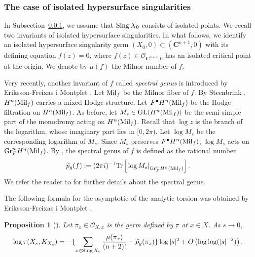 \documentclass[amscd, leqno]{amsart}
\theoremstyle{plain}
\newtheorem{proposition}[theorem]{Proposition}
\theoremstyle{definition}
\theoremstyle{remark}
\begin{document}
\subsubsection
{The case of isolated hypersurface singularities}
\label{sect:5.2.2}
\par
In Subsection~\ref{sect:5.2.2}, we assume that ${\rm Sing}\,X_{0}$ consists of isolated points. 
We recall two invariants of isolated hypersurface singularities.
In what follows, we identify an isolated hypersurface singularity germ $(X_{0},0) \subset ({\mathbf C}^{n+1},0)$ 
with its defining equation $f(z)=0$, where $f(z) \in {\mathcal O}_{{\mathbf C}^{n+1},0}$ has an isolated critical point at the origin. 
We denote by $\mu(f)$ the Milnor number of $f$.
\par
Very recently, another invariant of $f$ called {\em spectral genus} is introduced by Eriksson-Freixas i Montplet \cite{ErikssonFreixas26}. 
Let ${\rm Mil}_{f}$ be the Milnor fiber of $f$. By Steenbrink \cite[Sect.\,3]{Steenbrink77}, 
$H^{n}({\rm Mil}_{f})$ carries a mixed Hodge structure. Let $F^{\bullet}H^{n}({\rm Mil}_{f})$ be the Hodge filtration on $H^{n}({\rm Mil}_{f})$. 
As before, let $M_{s} \in {\rm GL}( H^{n}({\rm Mil}_{f}) )$ be the semi-simple part of the monodromy acting on $H^{n}({\rm Mil}_{f})$. 
Recall that $\log z$ is the branch of the logarithm, whose imaginary part lies in $[0, 2\pi)$. 
Let $\log M_{s}$ be the corresponding logarithm of $M_{s}$. Since $M_{s}$ preserves $F^{\bullet}H^{n}({\rm Mil}_{f})$,
$\log M_{s}$ acts on ${\rm Gr}_{F}^{n} H^{n}({\rm Mil}_{f})$. By \cite{ErikssonFreixas26}, 
the spectral genus of $f$ is defined as the rational number 
$$
\widetilde{p}_{g}(f) := (2\pi i)^{-1} {\rm Tr} \left[ \left. \log M_{s} \right|_{{\rm Gr}_{F}^{n} H^{n}({\rm Mil}_{f})} \right].
$$
We refer the reader to \cite{ErikssonFreixas26} for further details about the spectral genus.
\par
The following formula for the asymptotic of the analytic torsion was obtained by Eriksson-Freixas i Montplet \cite[Cor.\,3.2]{ErikssonFreixas26}.


\begin{proposition}[\cite{ErikssonFreixas26}]
\label{prop:EF24}
Let $\pi_{x} \in {\mathcal O}_{X,x}$ is the germ defined by $\pi$ at $x \in X$. As $s \to 0$,
$$
\log \tau(X_{s}, K_{X_{s}}) 
= - \{ \sum_{x\in {\rm Sing}\,X_{0}} \frac{\mu(\pi_{x})}{(n+2)!} - \widetilde{p}_{g}(\pi_{x}) \} \log |s|^{2} +O\left( \log\log (|s|^{-2})\right).
$$
\end{proposition}
\end{document}
